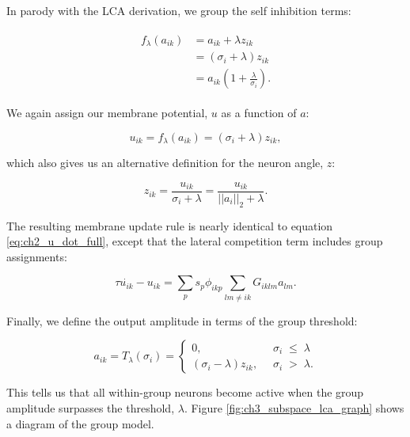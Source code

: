 In parody with the LCA derivation, we group the self inhibition terms:

\begin{align}\label{eq:ch3_f_of_a}
\begin{split}
    f_{\lambda}(a_{ik}) &= a_{ik} + \lambda z_{ik}\\
    &= \left(\sigma_{i}+\lambda\right) z_{ik}\\
    &= a_{ik}(1 + \frac{\lambda}{\sigma_{i}}).
\end{split}
\end{align}

We again assign our membrane potential, $u$ as a function of $a$:

\begin{equation}\label{eq:ch3_u_def}
  u_{ik} = f_{\lambda}(a_{ik}) = (\sigma_{i} + \lambda)z_{ik},
\end{equation}

which also gives us an alternative definition for the neuron angle, $z$:

\begin{equation}\label{eq:ch3_z_u_def}
   z_{ik} = \frac{u_{ik}}{\sigma_{i} + \lambda} = \frac{u_{ik}}{||a_{i}||_{2} + \lambda}.
\end{equation}

The resulting membrane update rule is nearly identical to equation \ref{eq:ch2_u_dot_full}, except that the lateral competition term includes group assignments:

\begin{equation}\label{eq:ch3_subspace_u_dot_def}
   \tau \dot{u_{ik}} - u_{ik} = \sum_{p}s_{p}\phi_{ikp} \sum_{lm \ne ik}G_{iklm}a_{lm}.
\end{equation}

Finally, we define the output amplitude in terms of the group threshold:

\begin{equation}\label{eq:ch3_subspace_threshold_func}
    a_{ik} = T_{\lambda}(\sigma_{i}) = \left\{
    \begin{aligned}
        0,\;\; & \sigma_{i}\; \leq\; \lambda \\
        (\sigma_{i}-\lambda)z_{ik},\;\; &\sigma_{i}\; >\; \lambda.
    \end{aligned}
    \right.
\end{equation}

This tells us that all within-group neurons become active when the group amplitude surpasses the threshold, $\lambda$. Figure \ref{fig:ch3_subspace_lca_graph} shows a diagram of the group model.

